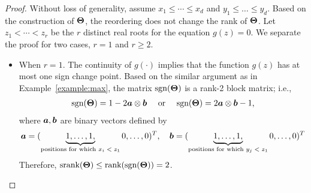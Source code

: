 \documentclass[11pt]{article}
\newcommand*{\KeepStyleUnderBrace}[1]{%
\mathop{%
\mathchoice
{\underbrace{\displaystyle#1}}%
{\underbrace{\textstyle#1}}%
{\underbrace{\scriptstyle#1}}%
{\underbrace{\scriptscriptstyle#1}}%
}\limits
}
\theoremstyle{plain}
\theoremstyle{definition}
\def\sign{\textup{sgn}}
\def\srank{\textup{srank}}
\def\rank{\textup{rank}}
\begin{document}
\begin{proof} 
Without loss of generality, assume $x_1\leq \cdots\leq x_d$ and $y_1\leq \ldots \leq y_d$. Based on the construction of $\bm{\Theta}$, the reordering does not change the rank of $\bm{\Theta}$. Let $z_1<\cdots<z_r$ be the $r$ distinct real roots for the equation $g(z)=0$. We separate the proof for two cases, $r=1$ and $r\geq 2$. 

\begin{itemize}[leftmargin=*,topsep=0pt,itemsep=-1ex,partopsep=1ex,parsep=1ex]
\item When $r=1$. The continuity of $g(\cdot)$ implies that the function $g(z)$ has at most one sign change point. Based on the similar argument as in Example~\ref{example:max}, the matrix $\sign(\mTheta)$ is a rank-2 block matrix; i.e., 
\begin{align}
\sign(\mTheta)=1-2\ma\otimes \mb \quad \text{ or } \quad \sign(\mTheta) = 2\ma\otimes\mb -1,
\end{align}
where $\bm{a}, \bm{b}$ are binary vectors defined by
\[
\ma=(\KeepStyleUnderBrace{1,\ldots,1,}_{\text{positions for which $x_{i}<z_1$}}0,\ldots,0)^T,\quad\mb=(\KeepStyleUnderBrace{1,\ldots,1,}_{\text{positions for which $y_j<z_1$}}0,\ldots,0)^T
\]
Therefore, $\srank(\mTheta)\leq \rank(\sign(\mTheta)) = 2$. 


\end{itemize}
\end{proof}
\end{document}
